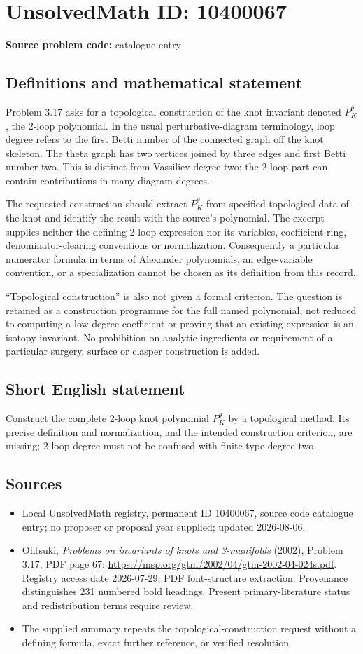 \documentclass[11pt]{article}
\begin{document}
\section*{UnsolvedMath ID: 10400067}
\textbf{Source problem code:} catalogue entry
\subsection{Definitions and mathematical statement}
Problem 3.17 asks for a topological construction of the knot invariant denoted \(P_K^\theta\), the 2-loop polynomial. In the usual perturbative-diagram terminology, loop degree refers to the first Betti number of the connected graph off the knot skeleton. The theta graph has two vertices joined by three edges and first Betti number two. This is distinct from Vassiliev degree two; the 2-loop part can contain contributions in many diagram degrees.

The requested construction should extract \(P_K^\theta\) from specified topological data of the knot and identify the result with the source's polynomial. The excerpt supplies neither the defining 2-loop expression nor its variables, coefficient ring, denominator-clearing conventions or normalization. Consequently a particular numerator formula in terms of Alexander polynomials, an edge-variable convention, or a specialization cannot be chosen as its definition from this record.

``Topological construction'' is also not given a formal criterion. The question is retained as a construction programme for the full named polynomial, not reduced to computing a low-degree coefficient or proving that an existing expression is an isotopy invariant. No prohibition on analytic ingredients or requirement of a particular surgery, surface or clasper construction is added.
\subsection{Short English statement}
Construct the complete 2-loop knot polynomial \(P_K^\theta\) by a topological method. Its precise definition and normalization, and the intended construction criterion, are missing; 2-loop degree must not be confused with finite-type degree two.
\subsection{Sources}
\begin{itemize}
\item Local UnsolvedMath registry, permanent ID 10400067, source code catalogue entry; no proposer or proposal year supplied; updated 2026-08-06.
\item Ohtsuki, \emph{Problems on invariants of knots and 3-manifolds} (2002), Problem 3.17, PDF page 67: \url{https://msp.org/gtm/2002/04/gtm-2002-04-024s.pdf}. Registry access date 2026-07-29; PDF font-structure extraction. Provenance distinguishes 231 numbered bold headings. Present primary-literature status and redistribution terms require review.
\item The supplied summary repeats the topological-construction request without a defining formula, exact further reference, or verified resolution.
\end{itemize}
\end{document}
